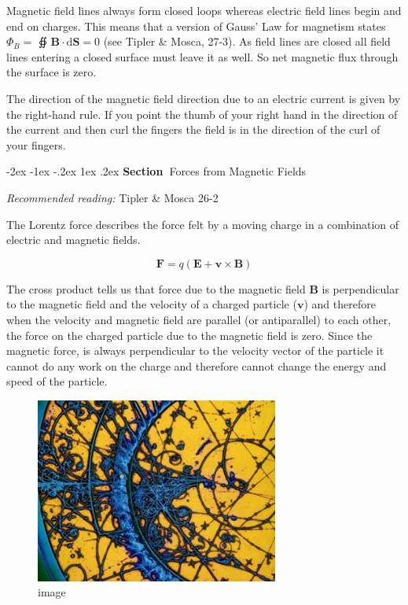 \documentclass[
]{book}
\makeatletter
\renewcommand\section{%
\@startsection{section}{1}{\z@}%
              {-2ex \@plus -1ex \@minus -.2ex}%
              {1ex \@plus .2ex}%
              {\sffamily\bfseries\large\noindent Section~}}
\numberwithin{equation}{section}
\makeatother
\begin{document}
Magnetic field lines always form closed loops whereas electric field
lines begin and end on charges. This means that a version of Gauss' Law
for magnetism states \(\Phi_B =\) ∯ \(\mathbf{B} \cdot \mathrm{d} \mathbf{S} = 0\) (see Tipler \&
Mosca, 27-3). As field lines are closed all field lines entering a
closed surface must leave it as well. So net magnetic flux through the
surface is zero.

The direction of the magnetic field direction due to an electric current
is given by the right-hand rule. If you point the thumb of your right
hand in the direction of the current and then curl the fingers the field
is in the direction of the curl of your fingers.

\hypertarget{forces-from-magnetic-fields}{%
\section{Forces from Magnetic Fields}\label{forces-from-magnetic-fields}}

\emph{Recommended reading:} Tipler \& Mosca 26-2

The Lorentz force describes the force felt by a moving charge in a
combination of electric and magnetic fields.

\begin{equation}
\label{eq:qvCrossB}
\mathbf{F} = q(\mathbf{E} + \mathbf{v} \times \mathbf{B})
\end{equation}

The cross product tells us that force due to the magnetic field \(\mathbf{B}\) is
perpendicular to the magnetic field and the velocity of a charged
particle (\(\mathbf{v}\)) and therefore when the velocity and magnetic field are
parallel (or antiparallel) to each other, the force on the charged
particle due to the magnetic field is zero. Since the magnetic force, is
always perpendicular to the velocity vector of the particle it cannot do
any work on the charge and therefore cannot change the energy and speed
of the particle.

\begin{figure}
\centering
\includegraphics[width=80mm,height=\textheight]{Figures/bubble_chamber.jpg}
\caption{image}
\end{figure}
\end{document}
